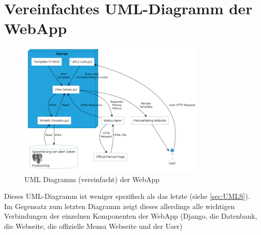 \section{Vereinfachtes UML-Diagramm der WebApp} \label{sec:UMLG}
\begin{figure}[ht]
    \centering
    \includegraphics[width=0.8\textwidth]{images/UML-General.png}
    \caption{UML Diagramm (vereinfacht) der WebApp}
    \label{fig:UMLG}
\end{figure}

Dieses UML-Diagramm ist weniger spezifisch als das letzte (siehe
\ref{sec:UMLS}). Im Gegensatz zum letzten Diagramm zeigt dieses allerdings alle
wichtigen Verbindungen der einzelnen Komponenten der WebApp (Django, die
Datenbank, die Webseite, die offizielle Mensa Webseite und der User)


